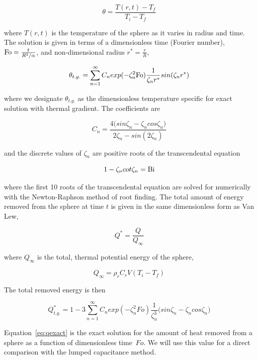\begin{equation}
	\theta=\frac{T(r,t)-T_{f}}{T_{i}-T_{f}}
\end{equation}

where $T(r,t)$ is the temperature of the sphere as it varies in radius and time. The solution is given in terms of a dimensionless time (Fourier number), $\mathrm{Fo} = \frac{t}{R^2/\alpha}$, and non-dimensional radius $r^* = \frac{r}{R}$,

\begin{equation}
	\theta_{t.g.}=\sum_{n=1}^\infty C_n exp(-\zeta_n^2 \mathrm{Fo})\frac{1}{\zeta_nr^*} sin(\zeta_n r^*)
\end{equation}

where we designate $\theta_{t.g.}$ as the dimensionless temperature specific for exact solution with thermal gradient. The coefficients are

\begin{equation}
	C_n=\frac{4\big(sin\zeta_n -\zeta_n cos\zeta_n\big)}{2\zeta_n-sin(2\zeta_n)}
\end{equation}

and the discrete values of $\zeta_n$ are positive roots of the transcendental equation

\begin{equation}\label{eq:traneqn}
	1-\zeta_ncot\zeta_n = \mathrm{Bi}
\end{equation}

where the first 10 roots of the transcendental equation are solved for numerically with the Newton-Raphson method of root finding. The total amount of energy removed from the sphere at time $t$ is given in the same dimensionless form as Van Lew\cite{VanLew2010}, 

\begin{equation}
	Q^*=\frac{Q}{Q_{\infty}}
\end{equation}

where $Q_{\infty}$ is the total, thermal potential energy of the sphere,

\begin{equation}
	Q_{\infty}=\rho_rC_rV(T_{i}-T_{f})
\end{equation}

The total removed energy is then

\begin{equation}
\label{eq:qexact}
	Q^*_{t.g.}=1-3\sum_{n=1}^\infty C_n exp(-\zeta_n^2 Fo)\frac{1}{\zeta_n^3} \big(sin\zeta_n-\zeta_ncos\zeta_n\big)
\end{equation}

Equation~\ref{eq:qexact} is the exact solution for the amount of heat removed from a sphere as a function of dimensionless time~$Fo$. We will use this value for a direct comparison with the lumped capacitance method.



